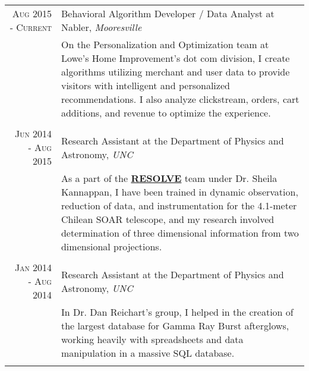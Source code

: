 \documentclass[a4paper,10pt]{article} %
\begin{document}
\begin{tabular}{r|p{11cm}}

\textsc{Aug 2015 - Current} & Behavioral Algorithm Developer / Data Analyst at Nabler, \emph{Mooresville} \\
& \footnotesize{On the Personalization and Optimization team at Lowe's Home Improvement's dot com division, I create algorithms utilizing merchant and user data to provide visitors with intelligent and personalized recommendations. I also analyze clickstream, orders, cart additions, and revenue to optimize the experience.}\\

\multicolumn{2}{c}{} \\


\textsc{Jun 2014 - Aug 2015} & Research Assistant at the Department of Physics and Astronomy, \emph{UNC} \\ 
& \footnotesize{As a part of the \textbf{\href{http://resolve.astro.unc.edu/}{RESOLVE}} team under Dr. Sheila Kannappan, I have been trained in dynamic observation, reduction of data, and instrumentation for the 4.1-meter Chilean SOAR telescope, and my research involved determination of three dimensional information from two dimensional projections.}\\
\multicolumn{2}{c}{} \\


\textsc{Jan 2014 - Aug 2014} & Research Assistant at the Department of Physics and Astronomy, \emph{UNC} \\ 
& \footnotesize{In Dr. Dan Reichart's group, I helped in the creation of the largest database for Gamma Ray Burst afterglows, working heavily with spreadsheets and data manipulation in a massive SQL database.}\\
\multicolumn{2}{c}{} \\


\end{tabular}
\end{document}
